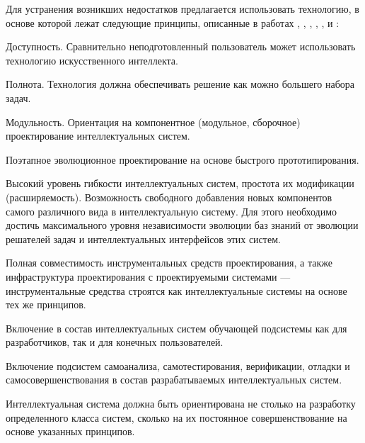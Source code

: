 \begin{partbacktext}
Для устранения возникших недостатков предлагается использовать технологию, в основе которой лежат следующие принципы, описанные в работах , , , , ,  и :
\begin{textitemize}
	\item Доступность. Сравнительно неподготовленный пользователь может использовать технологию искусственного интеллекта.
	\item Полнота. Технология должна обеспечивать решение как можно большего набора задач.
	\item Модульность. Ориентация на компонентное (модульное, сборочное) проектирование интеллектуальных систем.
	\item Поэтапное эволюционное проектирование на основе быстрого прототипирования.
	\item Высокий уровень гибкости интеллектуальных систем, простота их модификации (расширяемость). Возможность свободного добавления новых компонентов самого различного вида в интеллектуальную систему. Для этого необходимо достичь максимального уровня независимости эволюции баз знаний от эволюции решателей задач и интеллектуальных интерфейсов этих систем.
	\item Полная совместимость инструментальных средств проектирования, а также инфраструктура проектирования с проектируемыми системами --- инструментальные средства строятся как интеллектуальные системы на основе тех же принципов.
	\item Включение в состав интеллектуальных систем обучающей подсистемы как для разработчиков, так и для конечных пользователей.
	\item Включение подсистем самоанализа, самотестирования, верификации, отладки и самосовершенствования в состав разрабатываемых интеллектуальных систем.
\end{textitemize}

Интеллектуальная система должна быть ориентирована не столько на разработку определенного класса систем, сколько на их постоянное совершенствование на основе указанных принципов.


\end{partbacktext}
